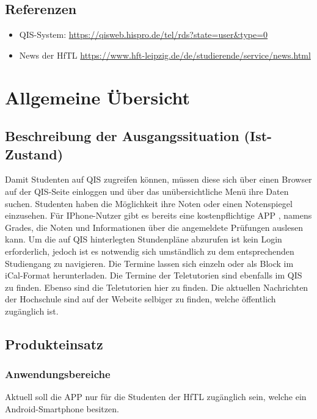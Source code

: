 \subsection{\textbf{Referenzen}}

\begin{itemize}		
	\item QIS-System:  \url{https://qisweb.hispro.de/tel/rds?state=user&type=0} 
	
	\item News der HfTL  \url{https://www.hft-leipzig.de/de/studierende/service/news.html}	
\end{itemize}


\section{Allgemeine Übersicht}

\subsection{\textbf{Beschreibung der Ausgangssituation (Ist-Zustand) }}

Damit Studenten auf \acs{QIS} zugreifen können, müssen diese sich über einen Browser auf der \acs{QIS}-Seite einloggen und über das unübersichtliche Menü ihre Daten suchen.
Studenten haben die Möglichkeit ihre Noten oder einen Notenspiegel einzusehen.
Für IPhone-Nutzer gibt es bereits eine kostenpflichtige \acs{APP} , namens Grades, die Noten und Informationen über die angemeldete Prüfungen auslesen kann.
Um die auf \acs{QIS} hinterlegten Stundenpläne abzurufen ist kein Login erforderlich, jedoch ist es notwendig sich umständlich zu dem entsprechenden Studiengang zu navigieren. Die Termine lassen sich einzeln oder als Block im \acs{iCal}-Format herunterladen. Die Termine der Teletutorien sind ebenfalls im QIS zu finden.
Ebenso sind die Teletutorien hier zu finden.
Die aktuellen Nachrichten der Hochschule sind auf der Webeite selbiger zu finden, welche öffentlich zugänglich ist.


\subsection{\textbf{Produkteinsatz}}

\subsubsection{Anwendungsbereiche}
Aktuell soll die APP nur für die Studenten der \acs{HfTL} zugänglich sein, welche ein Android-Smartphone besitzen. 

